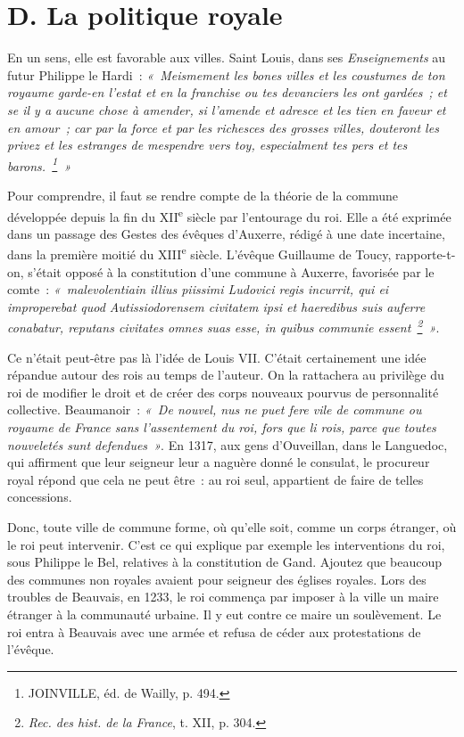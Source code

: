 \documentclass[french,twoside]{book} %
\begin{document}
\section[{D. La politique royale}]{D. La politique royale}
\label{c08d}
\noindent En un sens, elle est favorable aux villes. Saint Louis, dans ses \emph{Enseignements} au futur Philippe le Hardi : \emph{« Meismement les bones villes et les coustumes de ton royaume garde-en l’estat et en la franchise ou tes devanciers les ont gardées ; et se il y a aucune chose à amender, si l’amende et adresce et les tien en faveur et en amour ; car par la force et par les richesces des grosses villes, douteront les privez et les estranges de mespendre vers toy, especialment tes pers et tes barons. \footnote{JOINVILLE, éd. de Wailly, p. 494.} »}\par
\label{p79} Pour comprendre, il faut se rendre compte de la théorie de la commune développée depuis la fin du XII\textsuperscript{e} siècle par l’entourage du roi. Elle a été exprimée dans un passage des Gestes des évêques d’Auxerre, rédigé à une date incertaine, dans la première moitié du XIII\textsuperscript{e} siècle. L’évêque Guillaume de Toucy, rapporte-t-on, s’était opposé à la constitution d’une commune à Auxerre, favorisée par le comte : \emph{« malevolentiain illius piissimi Ludovici regis incurrit, qui ei improperebat quod Autissiodorensem civitatem ipsi et haeredibus suis auferre conabatur, reputans civitates omnes suas esse, in quibus communie essent \footnote{{\itshape Rec. des hist. de la France}, t. XII, p. 304.} »}.\par
Ce n’était peut-être pas là l’idée de Louis VII. C’était certainement une idée répandue autour des rois au temps de l’auteur. On la rattachera au privilège du roi de modifier le droit et de créer des corps nouveaux pourvus de personnalité collective. Beaumanoir : \emph{« De nouvel, nus ne puet fere vile de commune ou royaume de France sans l’assentement du roi, fors que li rois, parce que toutes nouveletés sunt defendues »}. En 1317, aux gens d’Ouveillan, dans le Languedoc, qui affirment que leur seigneur leur a naguère donné le consulat, le procureur royal répond que cela ne peut être : au roi seul, appartient de faire de telles concessions.\par
Donc, toute ville de commune forme, où qu’elle soit, comme un corps étranger, où le roi peut intervenir. C’est ce qui explique par exemple les interventions du roi, sous Philippe le Bel, relatives à la constitution de Gand. Ajoutez que beaucoup des communes non royales avaient pour seigneur des églises royales. Lors des troubles de Beauvais, en 1233, le roi commença par imposer à la ville un maire étranger à la communauté urbaine. Il y eut contre ce maire un soulèvement. Le roi entra à Beauvais avec une armée et refusa de céder aux protestations de l’évêque.\par
\end{document}
